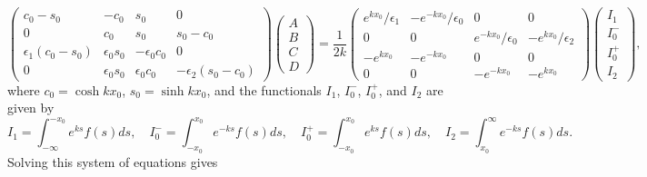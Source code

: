 \documentclass{aastex61}
\begin{document}
\begin{equation}
\left(
\begin{matrix}
c_0-s_0              &-c_0           &s_0              &0                   \\
0                    &c_0            &s_0              &s_0-c_0           \\
\epsilon_1(c_0-s_0)  &\epsilon_0s_0  &-\epsilon_0c_0   &0                   \\
0                    &\epsilon_0s_0  &\epsilon_0c_0    &-\epsilon_2(s_0-c_0)
\end{matrix}
\right)
\left(
\begin{matrix}
A \\
B \\
C \\
D
\end{matrix}
\right)
=
\frac{1}{2k}
\left(
\begin{matrix}
e^{kx_0}/\epsilon_1  & -e^{-kx_0}/\epsilon_0  & 0                      & 0                   \\
0                    & 0                      & e^{-kx_0}/\epsilon_0   & -e^{kx_0}/\epsilon_2 \\
-e^{kx_0} & -e^{-kx_0}  & 0                      & 0                   \\
0                    & 0                      & -e^{-kx_0}  & -e^{kx_0}
\end{matrix}
\right)
\left(
\begin{matrix}
I_1    \\
I_0^- \\
I_0^+ \\
I_2
\end{matrix}
\right),
\label{coefmatrix}
\end{equation}
where $c_0 = \cosh{kx_0}$, $s_0 = \sinh{kx_0}$, and the functionals $I_1$, $I_0^-$, $I_0^+$, and $I_2$ are given by
\begin{equation}
I_1 = \int_{-\infty}^{-x_0} e^{ks}f(s) ds, \quad I_0^- = \int_{-x_0}^{x_0} e^{-ks}f(s) ds, \quad I_0^+ = \int_{-x_0}^{x_0} e^{ks}f(s) ds, \quad I_2  = \int_{x_0}^{\infty} e^{-ks}f(s) ds.
\end{equation}
Solving this system of equations gives
\newcommand{\e}{\epsilon}
\end{document}
